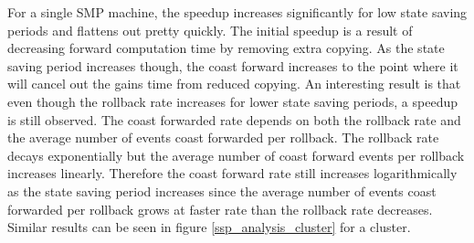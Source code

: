\documentclass[11pt]{book}
\begin{document}
For a single SMP machine, the speedup increases significantly for low state saving periods and
flattens out pretty quickly. The initial speedup is a result of decreasing forward computation
time by removing extra copying. As the state saving period increases though, the coast forward 
increases to the point where it will cancel out the gains time from reduced copying. An interesting
result is that even though the rollback rate increases for lower state saving periods, a speedup
is still observed. The coast forwarded rate depends on both the rollback rate and the
average number of events coast forwarded per rollback. The rollback rate decays exponentially
but the average number of coast forward events per rollback increases linearly. Therefore the
coast forward rate still increases logarithmically as the state saving period increases since
the average number of events coast forwarded per rollback grows at faster rate than the rollback
rate decreases. Similar results can be seen in figure \ref{ssp_analysis_cluster} for a cluster.
\end{document}
